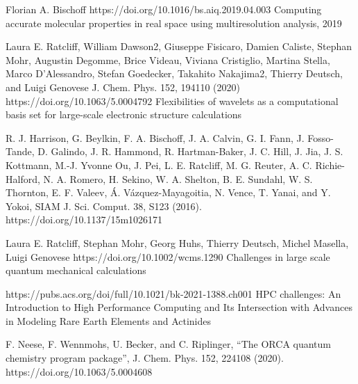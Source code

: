 \documentclass{article}
\begin{document}
\begin{thebibliography}{}


Florian A. Bischoff https://doi.org/10.1016/bs.aiq.2019.04.003  Computing accurate molecular properties in real space using multiresolution analysis,  2019

Laura E. Ratcliff,  William Dawson2, Giuseppe Fisicaro, Damien Caliste, Stephan Mohr, Augustin Degomme, Brice Videau, Viviana Cristiglio, Martina Stella, Marco D’Alessandro, Stefan Goedecker, Takahito Nakajima2, Thierry Deutsch, and Luigi Genovese J. Chem. Phys. 152, 194110 (2020) https://doi.org/10.1063/5.0004792 Flexibilities of wavelets as a computational basis set for large-scale electronic structure calculations

R. J. Harrison, G. Beylkin, F. A. Bischoff, J. A. Calvin, G. I. Fann, J. Fosso-Tande, D. Galindo, J. R. Hammond, R. Hartman-Baker, J. C. Hill, J. Jia, J. S. Kottmann, M.-J. Yvonne Ou, J. Pei, L. E. Ratcliff, M. G. Reuter, A. C. Richie-Halford, N. A. Romero, H. Sekino, W. A. Shelton, B. E. Sundahl, W. S. Thornton, E. F. Valeev, Á. Vázquez-Mayagoitia, N. Vence, T. Yanai, and Y. Yokoi, SIAM J. Sci. Comput. 38, S123 (2016). https://doi.org/10.1137/15m1026171

Laura E. Ratcliff, Stephan Mohr, Georg Huhs, Thierry Deutsch, Michel Masella, Luigi Genovese  https://doi.org/10.1002/wcms.1290 Challenges in large scale quantum mechanical calculations


 https://pubs.acs.org/doi/full/10.1021/bk-2021-1388.ch001  HPC challenges: An Introduction to High Performance Computing and Its Intersection with Advances in Modeling Rare Earth Elements and Actinides
 
 F. Neese, F. Wennmohs, U. Becker, and C. Riplinger, “The ORCA quantum chemistry program package”, J. Chem. Phys. 152, 224108 (2020). https://doi.org/10.1063/5.0004608
 

\end{thebibliography}
\end{document}
